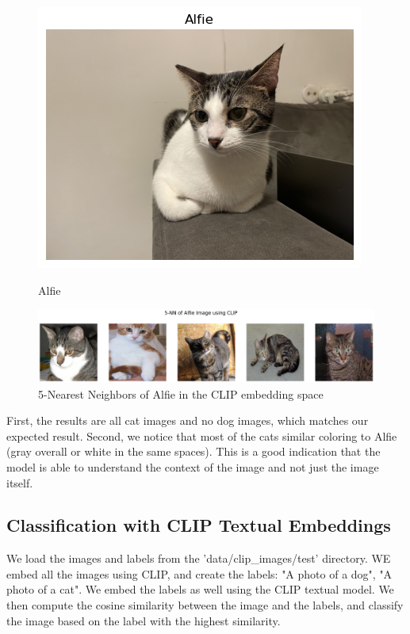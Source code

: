 \documentclass{article}
\begin{document}
\begin{figure}[h!]
    \centering
    \begin{minipage}[b]{0.15\textwidth}
        \centering
        \includegraphics[width=\textwidth]{figs/3.2_alfie.png}
        \caption{Alfie}
        \label{fig:alfie}
    \end{minipage}
    \hfill
    \begin{minipage}[b]{0.75\textwidth}
        \centering
        \includegraphics[width=\textwidth]{figs/3.2_5nn.png}
        \caption{5-Nearest Neighbors of Alfie in the CLIP embedding space}
        \label{fig:alfie_nn}
    \end{minipage}
\end{figure}

First, the results are all cat images and no dog images, which matches our expected result. Second, we notice that most of the cats similar coloring to Alfie (gray overall or white in the same spaces). This is a good indication that the model is able to understand the context of the image and not just the image itself.

\subsection{Classification with CLIP Textual Embeddings}
We load the images and labels from the 'data/clip\_images/test' directory.
WE embed all the images using CLIP, and create the labels: "A photo of a dog", "A photo of a cat". We embed the labels as well using the CLIP textual model. We then compute the cosine similarity between the image and the labels, and classify the image based on the label with the highest similarity. 
\end{document}

